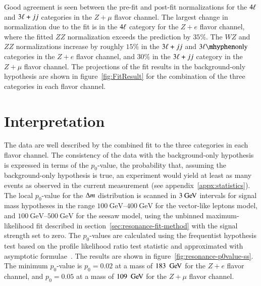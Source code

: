 Good agreement is seen between the pre-fit and post-fit normalizations for the $4\ell$ and $3\ell+jj$ categories in the $Z+\mu$ flavor channel. The largest change in normalization due to the fit is in the $4\ell$ category for the $Z+e$ flavor channel, where the fitted $ZZ$ normalization exceeds the prediction by $35\%$. The $WZ$ and $ZZ$ normalizations increase by roughly $15\%$ in the $3\ell+jj$ and $\threelo$ categories in the $Z+e$ flavor channel, and $30\%$ in the $3\ell+jj$ category in the $Z+\mu$ flavor channel. The projections of the fit results in the background-only hypothesis are shown in figure~\ref{fig:FitResult} for the combination of the three categories in each flavor channel.




\section{Interpretation}\label{sec:resonance-interpretation}
The data are well described by the combined fit to the three categories in each flavor channel. The consistency of the data with the background-only hypothesis is expressed in terms of the $p_0$-value, the probability that, assuming the background-only hypothesis is true, an experiment would yield at least as many events as observed in the current measurement (see appendix~\ref{appx:statistics}). The local $p_0$-value for the $\Delta m$ distribution is scanned in $3 \GeV$ intervals for signal mass hypotheses in the range $\SIrange[range-phrase=-]{100}{400}{\giga\electronvolt}$ for the vector-like leptons model, and $\SIrange[range-phrase=-]{100}{500}{\giga\electronvolt}$ for the seesaw model, using the unbinned maximum-likelihood fit described in section~\ref{sec:resonance-fit-method} with the signal strength set to zero. The $p_0$-values are calculated using the frequentist hypothesis test based on the profile likelihood ratio test statistic and approximated with asymptotic formulae~\cite{asimov}. The results are shown in figure~\ref{fig:resonance-p0value-ss}. The minimum $p_0$-value is $p_0=0.02$ at a mass of $183~\GeV$ for the $Z+e$ flavor channel, and $p_0=0.05$ at a mass of $109~\GeV$ for the $Z+\mu$ flavor channel.


